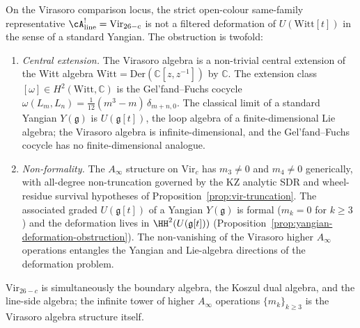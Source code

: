 \begin{proposition}
\label{prop:virasoro-no-yangian-deformation}
On the Virasoro comparison locus, the strict open-colour
same-family representative
$\cA^!_{\mathrm{line}} = \mathrm{Vir}_{26-c}$ is not a filtered
deformation of $U(\mathrm{Witt}{[t]})$ in the sense of a standard
Yangian. The obstruction is twofold:
\begin{enumerate}[label=\textup{(\alph*)}]
\item \emph{Central extension.}\; The Virasoro algebra is a
 non-trivial central extension of the Witt algebra
 $\mathrm{Witt} = \mathrm{Der}(\mathbb{C}[z,z^{-1}])$ by
 $\mathbb{C}$. The extension class
 $[\omega] \in H^2(\mathrm{Witt}, \mathbb{C})$ is the
 Gel'fand--Fuchs cocycle
 $\omega(L_m, L_n) = \tfrac{1}{12}(m^3 - m)\,\delta_{m+n,0}$.
 The classical limit of a standard Yangian $Y(\mathfrak{g})$ is
 $U(\mathfrak{g}{[t]})$, the loop algebra of a finite-dimensional
 Lie algebra; the Virasoro algebra is infinite-dimensional, and
 the Gel'fand--Fuchs cocycle has no finite-dimensional analogue.
\item \emph{Non-formality.}\; The $A_\infty$ structure on
 $\mathrm{Vir}_c$ has $m_3\ne0$ and $m_4\ne0$ generically, with
 all-degree non-truncation governed by the KZ analytic SDR and
 wheel-residue survival hypotheses of
 Proposition~\ref{prop:vir-truncation}. The associated graded
 $U(\mathfrak{g}{[t]})$ of a Yangian $Y(\mathfrak{g})$ is formal
 ($m_k = 0$ for $k \ge 3$) and the deformation lives in
 $\HH^2(U(\mathfrak{g}{[t]}))$
 (Proposition~\ref{prop:yangian-deformation-obstruction}). The
 non-vanishing of the Virasoro higher $A_\infty$ operations
 entangles the Yangian and Lie-algebra directions of the
 deformation problem.
\end{enumerate}
$\mathrm{Vir}_{26-c}$ is simultaneously the boundary algebra, the
Koszul dual algebra, and the line-side algebra; the infinite tower
of higher $A_\infty$ operations $\{m_k\}_{k \ge 3}$ is the Virasoro
algebra structure itself.
\end{proposition}

